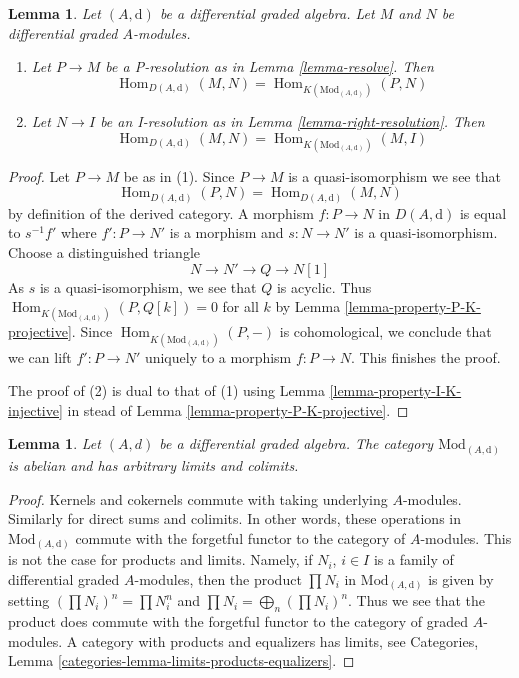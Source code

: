 \documentclass{stacks-project}
\theoremstyle{plain}
\newtheorem{lemma}[subsection]{Lemma}
\theoremstyle{definition}
\theoremstyle{remark}
\numberwithin{equation}{subsection}
\def\Hom{\mathop{\mathrm{Hom}}\nolimits}
\begin{document}
\begin{lemma}
\label{lemma-hom-derived}
Let $(A, \text{d})$ be a differential graded algebra.
Let $M$ and $N$ be differential graded $A$-modules.
\begin{enumerate}
\item Let $P \to M$ be a P-resolution as in
Lemma \ref{lemma-resolve}. Then
$$
\Hom_{D(A, \text{d})}(M, N) =
\Hom_{K(\text{Mod}_{(A, \text{d})})}(P, N)
$$
\item Let $N \to I$ be an I-resolution as in
Lemma \ref{lemma-right-resolution}. Then
$$
\Hom_{D(A, \text{d})}(M, N) =
\Hom_{K(\text{Mod}_{(A, \text{d})})}(M, I)
$$
\end{enumerate}
\end{lemma}

\begin{proof}
Let $P \to M$ be as in (1). Since $P \to M$ is a quasi-isomorphism we see that
$$
\Hom_{D(A, \text{d})}(P, N) = \Hom_{D(A, \text{d})}(M, N)
$$
by definition of the derived category. A morphism
$f : P \to N$ in $D(A, \text{d})$ is equal to
$s^{-1}f'$ where $f' : P \to N'$ is a morphism and
$s : N \to N'$ is a quasi-isomorphism. Choose a distinguished triangle
$$
N \to N' \to Q \to N[1]
$$
As $s$ is a quasi-isomorphism, we see that $Q$ is acyclic. Thus
$\Hom_{K(\text{Mod}_{(A, \text{d})})}(P, Q[k]) = 0$ for all $k$ by
Lemma \ref{lemma-property-P-K-projective}. Since
$\Hom_{K(\text{Mod}_{(A, \text{d})})}(P, -)$
is cohomological, we conclude that we can lift $f' : P \to N'$
uniquely to a morphism $f : P \to N$. This finishes the proof.

\medskip\noindent
The proof of (2) is dual to that of (1) using
Lemma \ref{lemma-property-I-K-injective} in stead of
Lemma \ref{lemma-property-P-K-projective}.
\end{proof}

\begin{lemma}
\label{lemma-dgm-abelian}
Let $(A, d)$ be a differential graded algebra. The category
$\text{Mod}_{(A, \text{d})}$ is abelian and has arbitrary limits and colimits.
\end{lemma}

\begin{proof}
Kernels and cokernels commute with taking underlying $A$-modules.
Similarly for direct sums and colimits. In other words, these operations
in $\text{Mod}_{(A, \text{d})}$ commute with the forgetful functor to the
category of $A$-modules. This is not the case for products and limits.
Namely, if $N_i$, $i \in I$ is a family of
differential graded $A$-modules, then the product $\prod N_i$ in
$\text{Mod}_{(A, \text{d})}$ is given by setting $(\prod N_i)^n = \prod N_i^n$
and $\prod N_i = \bigoplus_n (\prod N_i)^n$. Thus we see that the product
does commute with the forgetful functor to the category of graded $A$-modules.
A category with products and equalizers has limits, see
Categories, Lemma \ref{categories-lemma-limits-products-equalizers}.
\end{proof}
\end{document}
